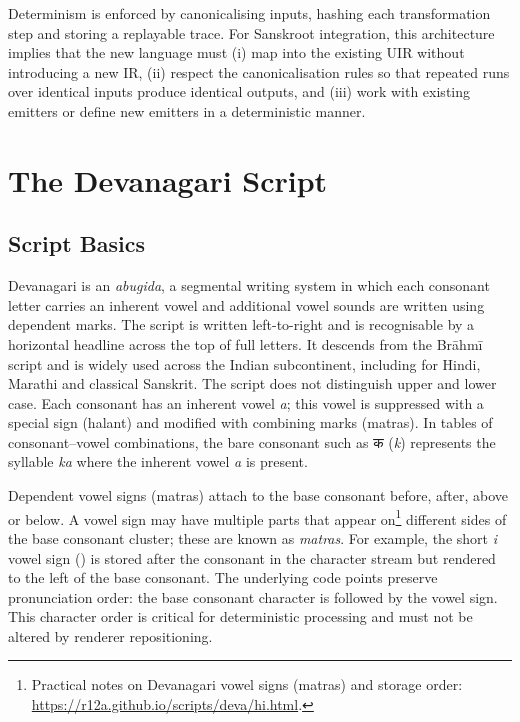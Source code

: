 \documentclass[12pt]{article}
\newcommand{\textdevanagarifont}[1]{{\devanagarifont #1}}
\begin{document}
Determinism is enforced by canonicalising inputs, hashing each transformation
step and storing a replayable trace.  For Sanskroot integration, this
architecture implies that the new language must (i) map into the existing
UIR without introducing a new IR, (ii) respect the canonicalisation rules
so that repeated runs over identical inputs produce identical outputs, and
(iii) work with existing emitters or define new emitters in a deterministic
manner.

\section{The Devanagari Script}

\subsection{Script Basics}

Devanagari is an \emph{abugida}, a segmental writing system in which each
consonant letter carries an inherent vowel and additional vowel sounds are
written using dependent marks.  The script is written left-to-right and is
recognisable by a horizontal headline across the top of full letters.  It
descends from the Brāhmī script and is widely used across the Indian
subcontinent, including for Hindi, Marathi and classical Sanskrit.  The
script does not distinguish upper and lower case.  Each
consonant has an inherent vowel \textsl{a}; this vowel is suppressed with
a special sign (halant) and modified with combining marks (matras).  In
tables of consonant–vowel combinations, the bare consonant such as
\textdevanagarifont{क} (\emph{k}) represents the syllable \emph{ka} where the
inherent vowel \textsl{a} is present.

Dependent vowel signs (matras) attach to the base consonant before,
after, above or below.  A vowel sign may have multiple parts that appear on\footnote{Practical notes on Devanagari vowel signs (matras) and storage order: \url{https://r12a.github.io/scripts/deva/hi.html}.}
different sides of the base consonant cluster; these are known as
\emph{matras}.  For example, the short \emph{i}
vowel sign () is stored after the consonant in the
character stream but rendered to the left of the base consonant.  The
underlying code points preserve pronunciation order: the base consonant
character is followed by the vowel sign.  This
character order is critical for deterministic processing and must not be
altered by renderer repositioning.
\end{document}

